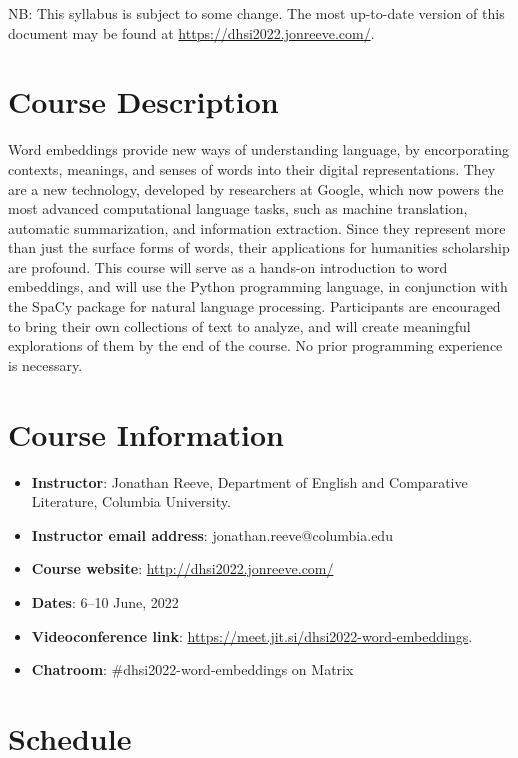 \documentclass[a4paper]{report}
\begin{document}
NB: This syllabus is subject to some change. The most up-to-date version of this document may be found at \url{https://dhsi2022.jonreeve.com/}.

\section{Course Description}

Word embeddings provide new ways of understanding language, by encorporating contexts, meanings, and senses of words into their digital representations. They are a new technology, developed by researchers at Google, which now powers the most advanced computational language tasks, such as machine translation, automatic summarization, and information extraction. Since they represent more than just the surface forms of words, their applications for humanities scholarship are profound. This course will serve as a hands-on introduction to word embeddings, and will use the Python programming language, in conjunction with the SpaCy package for natural language processing. Participants are encouraged to bring their own collections of text to analyze, and will create meaningful explorations of them by the end of the course. No prior programming experience is necessary.

\section{Course Information}

\begin{itemize}
\item \textbf{Instructor}: Jonathan Reeve, Department of English and Comparative Literature, Columbia University.
\item \textbf{Instructor email address}: jonathan.reeve@columbia.edu
\item \textbf{Course website}: \url{http://dhsi2022.jonreeve.com/}
\item \textbf{Dates}: 6–10 June, 2022
\item \textbf{Videoconference link}: \url{https://meet.jit.si/dhsi2022-word-embeddings}.
\item \textbf{Chatroom}: \#dhsi2022-word-embeddings on Matrix
\end{itemize}

\section{Schedule}
\end{document}
